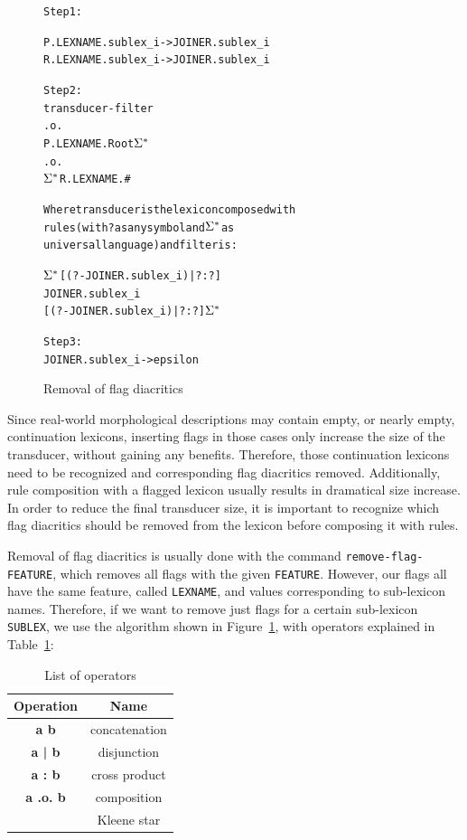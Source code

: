 \documentclass[10pt, a4paper]{article}
\begin{document}
\begin{figure}
\centering

\begin{alltt}
Step 1:

P.LEXNAME.sublex_i -> JOINER.sublex_i
R.LEXNAME.sublex_i -> JOINER.sublex_i

Step 2:
    transducer - filter
        .o.
    P.LEXNAME.Root \(\Sigma\sp{*}\)
        .o.
   \(\Sigma\sp{*}\) R.LEXNAME.#

Where transducer is the lexicon composed with
rules (with ? as any symbol and \(\Sigma\sp{*}\) as
universal language) and filter is:

\(\Sigma\sp{*}\) [(?-JOINER.sublex_i) | ?:?]
    JOINER.sublex_i 
[(?-JOINER.sublex_i) | ?:?] \(\Sigma\sp{*}\)

Step 3:
    JOINER.sublex_i -> epsilon
  
\end{alltt}

    \caption{Removal of flag diacritics
    \label{fig:lexc-remov}}
\end{figure}


Since real-world morphological descriptions may contain empty, or nearly
empty, continuation lexicons, inserting flags in those cases only
increase the size of the transducer, without gaining any
benefits. Therefore, those continuation lexicons need to be recognized and corresponding flag diacritics removed.
Additionally, rule composition with a flagged lexicon usually results in dramatical size
increase. In order to reduce the final transducer size, it is important to recognize which flag diacritics should be removed from the lexicon 
before composing it with rules.  

Removal of flag diacritics is usually done with the command \verb+remove-flag-FEATURE+, which removes all flags with the given \verb+FEATURE+. However, 
our flags all have the same feature, called \verb+LEXNAME+, and values corresponding to sub-lexicon names. Therefore, if we want to remove just flags 
for a certain sub-lexicon \verb+SUBLEX+, we use the algorithm shown in Figure~\ref{fig:lexc-remov}, with operators explained in Table~\ref{table:operators}:



\begin{table}
    \centering
    \begin{tabular}{|c|c|}
        \hline
        \bf Operation & \bf Name \\
        \hline\hline
        \bf a b & concatenation  \\
        \bf a | b & disjunction  \\
        \bf a : b & cross product  \\
        \bf a .o. b & composition  \\
        \bf * & Kleene star  \\
        

        \hline
    \end{tabular}
    \caption{List of operators
    \label{table:operators}}
\end{table}
\end{document}
